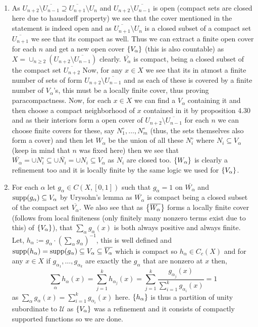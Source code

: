\documentclass[12pt,a4paper]{article}
\begin{document}
\begin{solution}
\begin{enumerate}[label=\alph*.]
    \item As $U_{n+2}\setminus \overline{U_{n-1}} \supseteq \overline{U_{n+1}}\setminus U_n$ and $U_{n+2}\setminus \overline{U_{n-1}}$ is open (compact sets are closed here due to hausdorff property) we see that the cover mentioned in the statement is indeed open and as $ \overline{U_{n+1}}\setminus U_n$ is a closed subset of a compact set $ \overline{U_{n+1}}$ we see that its compact as well. 
        Thus we can extract a finite open cover for each $n$ and get a new open cover $ \qty{V_\alpha}$ (this is also countable) as $X=\cup_{n\geq 2}(U_{n+2}\setminus \overline{U_{n-1}})$ clearly. 
        $ \overline{V_\alpha}$ is compact, being a closed subset of the compact set $ \overline{U_{n+2}}$
        Now, for any $x\in X$ we see that its in atmost a finite number of sets of form $U_{n+2}\setminus\overline{U_{n-1}}$ and as each of these is covered by a finite number of $V_\alpha$'s, this must be a locally finite cover, thus proving paracompactness. 
        Now, for each $x\in X$ we can find a $V_\alpha$ containing it and then choose a compact neighborhood of $x$ contained in it by proposition 4.30 and as their interiors form a open cover of $U_{n+2}\setminus \overline{U_{n-1}}$ for each $n$ we can choose finite covers for these, say $N_1^\circ,\ldots,N_m^\circ$ (thus, the sets themselves also form a cover) and then let $W_\alpha$ be the union of all these $N_i^\circ$ where $N_i \subseteq V_\alpha$ (keep in mind that $n$ was fixed here) then we see that $ \overline{W_\alpha} = \cup N_i^\circ \subseteq\cup \overline{N_i}=\cup N_i \subseteq V_\alpha$ as $N_i$ are closed too. 
        $ \qty{W_\alpha}$ is clearly a refinement too and it is locally finite by the same logic we used for $ \qty{V_\alpha}$. 
    \item For each $\alpha$ let $g_\alpha\in C(X,[0,1])$ such that $g_\alpha=1$ on $ \overline{W_\alpha}$ and $\operatorname{supp}(g_\alpha) \subseteq V_\alpha$ by Urysohn's lemma as $ \overline{W_\alpha}$ is compact being a closed subset of the compact set $ \overline{V_\alpha}$. 
        We also see that as $\qty{ \overline{W_\alpha}}$ forms a locally finite cover (follows from local finiteness (only finitely many nonzero terms exist due to this) of $ \qty{V_\alpha}$), that $\sum_\alpha g_\alpha(x)$ is both always positive and always finite. 
        Let, $h_\alpha:=g_\alpha\cdot(\sum_\alpha g_\alpha)^{-1}$, this is well defined and $\operatorname{supp}(h_\alpha)=\operatorname{supp}(g_\alpha) \subseteq V_\alpha \subseteq \overline{V_\alpha}$ which is compact so $h_\alpha\in C_c(X)$ and for any $x\in X$ if $g_{\alpha_1},\ldots,g_{\alpha_k}$ are exactly the $g_\alpha$ that are nonzero at $x$ then, 
        \[
            \sum_\alpha h_\alpha(x)=\sum_{j=1}^kh_{\alpha_j}(x)=\sum_{j=1}^k \frac{g_{\alpha_j}(x)}{\sum_{i=1}^kg_{\alpha_i}(x)}=1
        \]
        as $\sum_\alpha g_\alpha(x)=\sum_{i=1}^kg_{\alpha_i}(x)$ here. 
        $ \qty{h_\alpha}$ is thus a partition of unity subordinate to $\mathcal U$ as $\qty{V_\alpha}$ was a refinement and it consists of compactly supported functions so we are done. 
\end{enumerate}
\end{solution}
\end{document}
